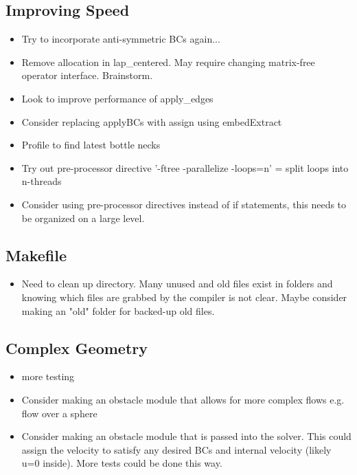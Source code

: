 \documentclass[11pt]{article}
\begin{document}
\subsection{Improving Speed}
\begin{itemize}
\setlength\itemsep{-1em}
\item Try to incorporate anti-symmetric BCs again...
\item Remove allocation in lap\_centered. May require changing matrix-free operator interface. Brainstorm.
\item Look to improve performance of apply\_edges
\item Consider replacing applyBCs with assign using embedExtract
\item Profile to find latest bottle necks
\item Try out pre-processor directive '-ftree -parallelize -loops=n' = split loops into n-threads
\item Consider using pre-processor directives instead of if statements, this needs to be organized on a large level.
\end{itemize}

\subsection{Makefile}
\begin{itemize}
\setlength\itemsep{-1em}
\item Need to clean up directory. Many unused and old files exist in folders and knowing which files are grabbed by the compiler is not clear. Maybe consider making an "old" folder for backed-up old files.
\end{itemize}

\subsection{Complex Geometry}
\begin{itemize}
\setlength\itemsep{-1em}
\item more testing
\item Consider making an obstacle module that allows for more complex flows
e.g. flow over a sphere
\item Consider making an obstacle module that is passed into the solver.
This could assign the velocity to satisfy any desired BCs and internal
velocity (likely u=0 inside). More tests could be done this way.
\end{itemize}
\end{document}

